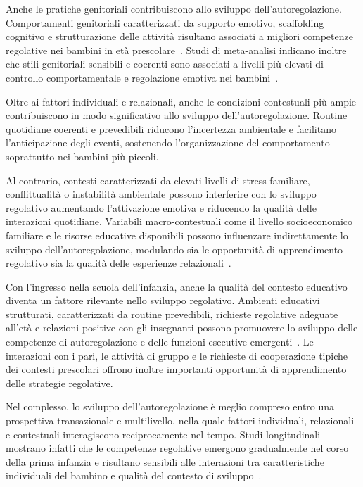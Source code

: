         Anche le pratiche genitoriali contribuiscono allo sviluppo dell'autoregolazione. Comportamenti genitoriali caratterizzati da supporto emotivo, scaffolding cognitivo e strutturazione delle attività risultano associati a migliori competenze regolative nei bambini in età prescolare~\cite{bernier2010}. Studi di meta-analisi indicano inoltre che stili genitoriali sensibili e coerenti sono associati a livelli più elevati di controllo comportamentale e regolazione emotiva nei bambini~\cite{karreman2006}.

        Oltre ai fattori individuali e relazionali, anche le condizioni contestuali più ampie contribuiscono in modo significativo allo sviluppo dell'autoregolazione. Routine quotidiane coerenti e prevedibili riducono l'incertezza ambientale e facilitano l'anticipazione degli eventi, sostenendo l'organizzazione del comportamento soprattutto nei bambini più piccoli.

        Al contrario, contesti caratterizzati da elevati livelli di stress familiare, conflittualità o instabilità ambientale possono interferire con lo sviluppo regolativo aumentando l'attivazione emotiva e riducendo la qualità delle interazioni quotidiane. Variabili macro-contestuali come il livello socioeconomico familiare e le risorse educative disponibili possono influenzare indirettamente lo sviluppo dell'autoregolazione, modulando sia le opportunità di apprendimento regolativo sia la qualità delle esperienze relazionali~\cite{bradley2002,evans2013}.

        Con l'ingresso nella scuola dell'infanzia, anche la qualità del contesto educativo diventa un fattore rilevante nello sviluppo regolativo. Ambienti educativi strutturati, caratterizzati da routine prevedibili, richieste regolative adeguate all'età e relazioni positive con gli insegnanti possono promuovere lo sviluppo delle competenze di autoregolazione e delle funzioni esecutive emergenti~\cite{blair2015}. Le interazioni con i pari, le attività di gruppo e le richieste di cooperazione tipiche dei contesti prescolari offrono inoltre importanti opportunità di apprendimento delle strategie regolative.

        Nel complesso, lo sviluppo dell'autoregolazione è meglio compreso entro una prospettiva transazionale e multilivello, nella quale fattori individuali, relazionali e contestuali interagiscono reciprocamente nel tempo. Studi longitudinali mostrano infatti che le competenze regolative emergono gradualmente nel corso della prima infanzia e risultano sensibili alle interazioni tra caratteristiche individuali del bambino e qualità del contesto di sviluppo~\cite{montroy2016}.

